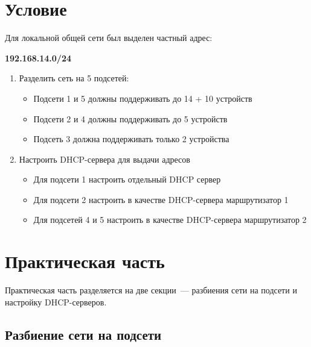 \chapter{Условие}%
\label{cha:uslovie}

Для локальной общей сети был выделен частный адрес:

\textbf{192.168.14.0/24}

\begin{enumerate}
    \item 
        Разделить сеть на 5 подсетей:
        \begin{itemize}
            \item 
                Подсети 1 и 5 должны поддерживать до 14 + 10 устройств
            \item 
                Подсети 2 и 4 должны поддерживать до 5 устройств
            \item 
                Подсеть 3 должна поддерживать только 2 устройства
        \end{itemize}

    \item 
        Настроить DHCP-сервера для выдачи адресов
        \begin{itemize}
            \item 
                Для подсети 1 настроить отдельный DHCP сервер
            \item 
                Для подсети 2 настроить в качестве DHCP-сервера маршрутизатор 1
            \item 
                 Для подсетей 4 и 5 настроить в качестве DHCP-сервера маршрутизатор 2
        \end{itemize}
\end{enumerate}

\chapter{Практическая часть}%
\label{cha:prakticheskaia_chast_}

Практическая часть разделяется на две секции~--- разбиения сети на подсети и настройку DHCP-серверов.

\section{Разбиение сети на подсети}%
\label{sec:razbienie_seti_na_podseti}


